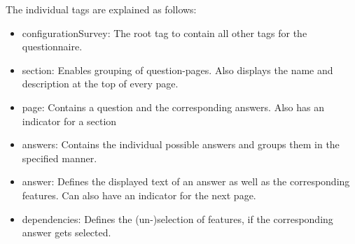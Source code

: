 The individual tags are explained as follows:

\begin{itemize}
\item configurationSurvey: The root tag to contain all other tags for the questionnaire.
\item section: Enables grouping of question-pages. Also displays the name and description at the top of every page.
\item page: Contains a question and the corresponding answers. Also has an indicator for a section
\item answers: Contains the individual possible answers and groups them in the specified manner.
\item answer: Defines the displayed text of an answer as well as the corresponding features. Can also have an indicator for the next page.
\item dependencies: Defines the (un-)selection of features, if the corresponding answer gets selected.
\end{itemize}